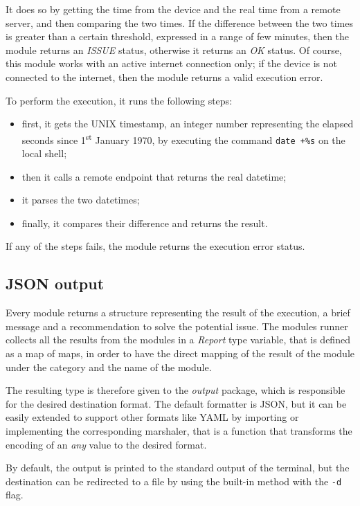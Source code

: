 It does so by getting the time from the device and the real time from a remote server, and then comparing the two times. If the difference between the two times is greater than a certain threshold, expressed in a range of few minutes, then the module returns an \textit{ISSUE} status, otherwise it returns an \textit{OK} status. Of course, this module works with an active internet connection only; if the device is not connected to the internet, then the module returns a valid execution error.

To perform the execution, it runs the following steps:
\begin{itemize}
  \item first, it gets the UNIX timestamp, an integer number representing the elapsed seconds since 1\textsuperscript{st} January 1970, by executing the command \texttt{date +\%s} on the local shell;
  \item then it calls a remote endpoint that returns the real datetime;
  \item it parses the two datetimes;
  \item finally, it compares their difference and returns the result.
\end{itemize}

If any of the steps fails, the module returns the execution error status.


\subsection{JSON output}
\label{sec:json-output}

Every module returns a structure representing the result of the execution, a brief message and a recommendation to solve the potential issue. The modules runner collects all the results from the modules in a \textit{Report} type variable, that is defined as a map of maps, in order to have the direct mapping of the result of the module under the category and the name of the module.

The resulting type is therefore given to the \textit{output} package, which is responsible for the desired destination format. The default formatter is JSON, but it can be easily extended to support other formats like YAML by importing or implementing the corresponding marshaler, that is a function that transforms the encoding of an \textit{any} value to the desired format.

By default, the output is printed to the standard output of the terminal, but the destination can be redirected to a file by using the built-in method with the \texttt{-d} flag.

